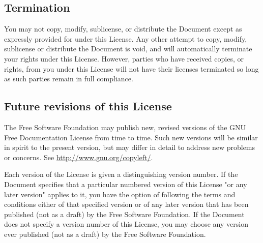 	\subsection{Termination}
	You may not copy, modify, sublicense, or distribute the Document except as expressly provided for under this License. Any other attempt to copy, modify, sublicense or distribute the Document is void, and will automatically terminate your rights under this License. However, parties who have received copies, or rights, from you under this License will not have their licenses terminated so long as such parties remain in full compliance. 

	\subsection{Future revisions of this License}
	The Free Software Foundation may publish new, revised versions of the GNU Free Documentation License from time to time. Such new versions will be similar in spirit to the present version, but may differ in detail to address new problems or concerns. See \href{http://www.gnu.org/copyleft/}{{\color{blue} http://www.gnu.org/copyleft/}}. 

	Each version of the License is given a distinguishing version number. If the Document specifies that a particular numbered version of this License "or any later version" applies to it, you have the option of following the terms and conditions either of that specified version or of any later version that has been published (not as a draft) by the Free Software Foundation. If the Document does not specify a version number of this License, you may choose any version ever published (not as a draft) by the Free Software Foundation. 
	
	\begin{center}
	\end{center}
	
	\newpage
	\thispagestyle{empty}
	\mbox{}
